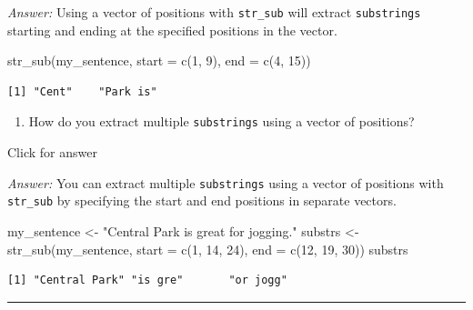 \documentclass[
]{book}
\newenvironment{Shaded}{\begin{snugshade}}{\end{snugshade}}
\newcommand{\AttributeTok}[1]{\textcolor[rgb]{0.77,0.63,0.00}{#1}}
\newcommand{\DecValTok}[1]{\textcolor[rgb]{0.00,0.00,0.81}{#1}}
\newcommand{\FunctionTok}[1]{\textcolor[rgb]{0.00,0.00,0.00}{#1}}
\newcommand{\NormalTok}[1]{#1}
\newcommand{\OtherTok}[1]{\textcolor[rgb]{0.56,0.35,0.01}{#1}}
\newcommand{\StringTok}[1]{\textcolor[rgb]{0.31,0.60,0.02}{#1}}
\providecommand{\tightlist}{%
  \setlength{\itemsep}{0pt}\setlength{\parskip}{0pt}}
\begin{document}
\emph{Answer:} Using a vector of positions with \texttt{str\_sub} will extract \texttt{substrings} starting and ending at the specified positions in the vector.

\begin{Shaded}
\begin{Highlighting}[]
\FunctionTok{str\_sub}\NormalTok{(my\_sentence, }\AttributeTok{start =} \FunctionTok{c}\NormalTok{(}\DecValTok{1}\NormalTok{, }\DecValTok{9}\NormalTok{), }\AttributeTok{end =} \FunctionTok{c}\NormalTok{(}\DecValTok{4}\NormalTok{, }\DecValTok{15}\NormalTok{))}
\end{Highlighting}
\end{Shaded}

\begin{verbatim}
[1] "Cent"    "Park is"
\end{verbatim}

\begin{enumerate}
\def\labelenumi{\alph{enumi}.}
\setcounter{enumi}{9}
\tightlist
\item
  How do you extract multiple \texttt{substrings} using a vector of positions?
\end{enumerate}

Click for answer

\emph{Answer:} You can extract multiple \texttt{substrings} using a vector of positions with \texttt{str\_sub} by specifying the start and end positions in separate vectors.

\begin{Shaded}
\begin{Highlighting}[]
\NormalTok{my\_sentence }\OtherTok{\textless{}{-}} \StringTok{"Central Park is great for jogging."}
\NormalTok{substrs }\OtherTok{\textless{}{-}} \FunctionTok{str\_sub}\NormalTok{(my\_sentence, }\AttributeTok{start =} \FunctionTok{c}\NormalTok{(}\DecValTok{1}\NormalTok{, }\DecValTok{14}\NormalTok{, }\DecValTok{24}\NormalTok{), }\AttributeTok{end =} \FunctionTok{c}\NormalTok{(}\DecValTok{12}\NormalTok{, }\DecValTok{19}\NormalTok{, }\DecValTok{30}\NormalTok{))}
\NormalTok{substrs}
\end{Highlighting}
\end{Shaded}

\begin{verbatim}
[1] "Central Park" "is gre"       "or jogg"     
\end{verbatim}

\begin{center}\rule{0.5\linewidth}{0.5pt}\end{center}
\end{document}
